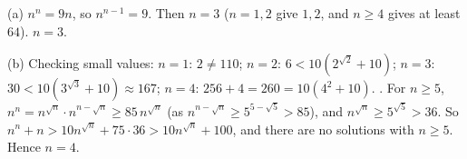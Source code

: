 (a) $n^n=9n$, so $n^{n-1}=9$. Then $n=3$ ($n=1,2$ give $1,2$, and $n\ge4$ gives at least $64$). $\boxed{n=3}$.

(b) Checking small values: $n=1$: $2\ne110$; $n=2$: $6<10(2^{\sqrt2}+10)$; $n=3$: $30<10(3^{\sqrt3}+10)\approx167$; $n=4$: $256+4=260=10(4^2+10)$. \checkmark. For $n\ge5$, $n^n=n^{\sqrt n}\cdot n^{n-\sqrt n}\ge85\,n^{\sqrt n}$ (as $n^{n-\sqrt n}\ge5^{5-\sqrt5}>85$), and $n^{\sqrt n}\ge5^{\sqrt5}>36$. So $n^n+n>10n^{\sqrt n}+75\cdot36>10n^{\sqrt n}+100$, and there are no solutions with $n\ge5$. Hence $\boxed{n=4}$.
